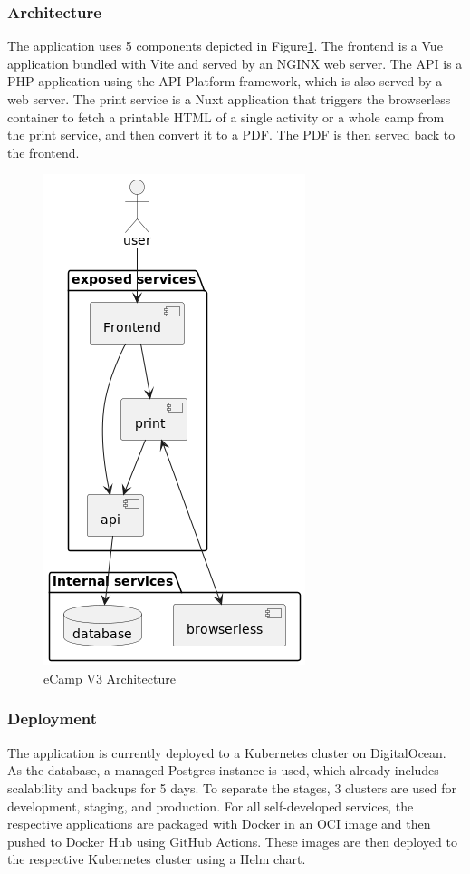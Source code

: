 \documentclass[conference]{IEEEtran}
\begin{document}
\subsubsection{Architecture}

The application uses 5 components depicted in Figure\ref{fig:ecamp3-architecture}.
The frontend is a Vue application bundled with Vite and served by an NGINX web server.
The API is a PHP application using the API Platform framework, which is also served by a web server.
The print service is a Nuxt application that triggers the browserless container to fetch a printable HTML of a single activity
or a whole camp from the print service, and then convert it to a PDF\@.
The PDF is then served back to the frontend.

\begin{figure}[h!]
	\centering
	\includegraphics[height=\columnwidth]{sections/assets/ecamp3-architecture}
	\caption{eCamp V3 Architecture}
	\label{fig:ecamp3-architecture}
\end{figure}

\subsubsection{Deployment}

The application is currently deployed to a Kubernetes cluster on DigitalOcean.
As the database, a managed Postgres instance is used, which already includes scalability and backups for 5 days.
To separate the stages, 3 clusters are used for development, staging, and production.
For all self-developed services, the respective applications are packaged with Docker in an OCI image and then
pushed to Docker Hub using GitHub Actions\cite{ecamp3-reusable-build-and-push}.
These images are then deployed to the respective Kubernetes cluster using a Helm chart\cite{ecamp3-reusable-dev-deployment, ecamp3-deployment-stage-prod}.
\end{document}
